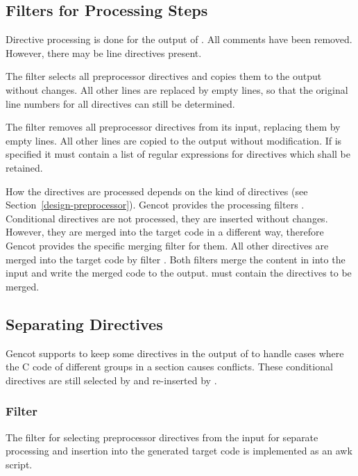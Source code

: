 \subsection{Filters for Processing Steps}

Directive processing is done for the output of . All comments have been removed. 
However, there may be line directives present. 

The filter  selects all preprocessor directives and
copies them to the output without changes. All other lines are replaced by empty lines, so that the original
line numbers for all directives can still be determined. 

The filter  removes all preprocessor directives from its input, replacing them by empty
lines. All other lines are copied to the output without modification. If  is specified it must 
contain a list of regular expressions for directives which shall be retained.

How the directives are processed depends on the kind of directives (see Section~\ref{design-preprocessor}).
Gencot provides the processing
filters . Conditional directives are not processed, they are inserted
without changes. However, they are merged into the target code in a different way, therefore Gencot provides 
the specific merging filter  for them. All other directives are merged into the 
target code by filter . Both filters merge the content in  
into the input and write the merged code to the output.  must contain the directives to be merged.

\subsection{Separating Directives}

Gencot supports to keep some directives in the output of  to handle cases where
the C code of different groups in a section causes conflicts. These conditional directives are still selected
by  and re-inserted by . 

\subsubsection{Filter }

The filter for selecting preprocessor directives from the input for separate processing and insertion into
the generated target code is implemented as an awk script.

